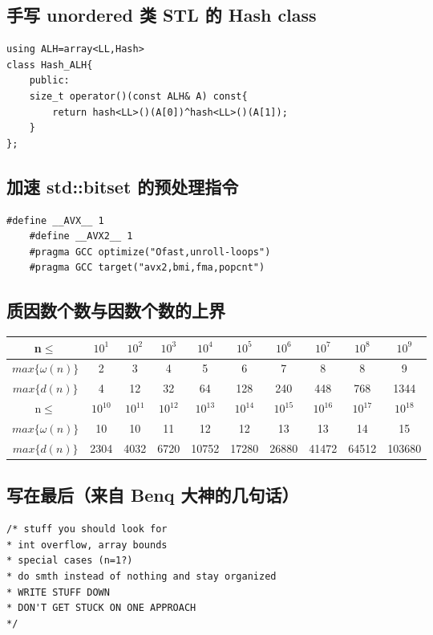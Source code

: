 \documentclass[12pt]{article}
\begin{document}


\subsection{手写 unordered 类 STL 的 Hash class}

\begin{lstlisting}[style=C++]
using ALH=array<LL,Hash>
class Hash_ALH{
	public:
	size_t operator()(const ALH& A) const{
		return hash<LL>()(A[0])^hash<LL>()(A[1]);
	}
};
\end{lstlisting}

\subsection{加速 std::bitset 的预处理指令}

\begin{lstlisting}[style=C++]
	#define __AVX__ 1
	#define __AVX2__ 1
	#pragma GCC optimize("Ofast,unroll-loops")
	#pragma GCC target("avx2,bmi,fma,popcnt")
\end{lstlisting}

\subsection{质因数个数与因数个数的上界}

\begin{table}[!ht]
	\centering
	\begin{tabular}{|c|c|c|c|c|c|c|c|c|c|}
		\hline
		n$\le$ & $10^{1}$ & $10^{2}$ & $10^{3}$ & $10^{4}$ & $10^{5}$ & $10^{6}$ & $10^{7}$ & $10^{8}$ & $10^{9}$ \\ \hline
		$max\{\omega(n)\}$ & 2 & 3 & 4 & 5 & 6 & 7 & 8 & 8 & 9 \\ \hline
		$max\{d(n)\}$ & 4 & 12 & 32 & 64 & 128 & 240 & 448 & 768 & 1344 \\ \hline
		n$\le$ & $10^{10}$ & $10^{11}$ & $10^{12}$ & $10^{13}$ & $10^{14}$ & $10^{15}$ & $10^{16}$ & $10^{17}$ & $10^{18}$ \\ \hline
		$max\{\omega(n)\}$ & 10 & 10 & 11 & 12 & 12 & 13 & 13 & 14 & 15 \\ \hline
		$max\{d(n)\}$ & 2304 & 4032 & 6720 & 10752 & 17280 & 26880 & 41472 & 64512 & 103680 \\ \hline
	\end{tabular}
\end{table}

\subsection{写在最后（来自 Benq 大神的几句话）}

\begin{lstlisting}[style=C++]
/* stuff you should look for
* int overflow, array bounds
* special cases (n=1?)
* do smth instead of nothing and stay organized
* WRITE STUFF DOWN
* DON'T GET STUCK ON ONE APPROACH
*/
\end{lstlisting}
\end{document}
